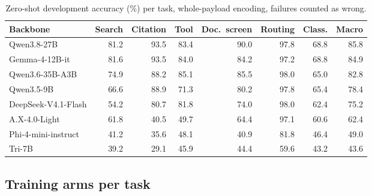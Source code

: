 \begin{table}[h]
\centering
\small
\caption{Zero-shot development accuracy (\%) per task, whole-payload encoding, failures
counted as wrong.}
\label{tab:leaderboard_tasks}
\begin{adjustbox}{max width=\linewidth}
\begin{tabular}{@{}lrrrrrrr@{}}
\toprule
Backbone & Search & Citation & Tool & Doc.\ screen & Routing & Class. & Macro \\
\midrule
Qwen3.8-27B & 81.2 & 93.5 & 83.4 & 90.0 & 97.8 & 68.8 & 85.8 \\
Gemma-4-12B-it & 81.6 & 93.5 & 84.0 & 84.2 & 97.2 & 68.8 & 84.9 \\
Qwen3.6-35B-A3B & 74.9 & 88.2 & 85.1 & 85.5 & 98.0 & 65.0 & 82.8 \\
Qwen3.5-9B & 66.6 & 88.9 & 71.3 & 80.2 & 97.8 & 65.4 & 78.4 \\
DeepSeek-V4.1-Flash & 54.2 & 80.7 & 81.8 & 74.0 & 98.0 & 62.4 & 75.2 \\
A.X-4.0-Light & 61.8 & 40.5 & 49.7 & 64.4 & 97.1 & 60.6 & 62.4 \\
Phi-4-mini-instruct & 41.2 & 35.6 & 48.1 & 40.9 & 81.8 & 46.4 & 49.0 \\
Tri-7B & 39.2 & 29.1 & 45.9 & 44.4 & 59.6 & 43.2 & 43.6 \\
\bottomrule
\end{tabular}
\end{adjustbox}
\end{table}

\subsection{Training arms per task}

